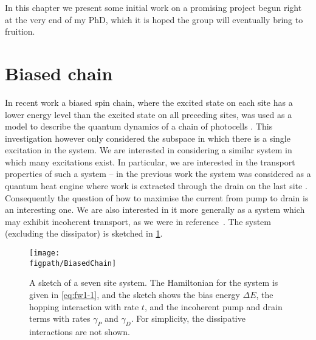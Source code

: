 In this chapter we present some initial work on a promising project begun right at the very end of my PhD, which it is hoped the group will eventually bring to fruition.

\section{Biased chain}
In recent work a biased spin chain, where the excited state on each site has a lower energy level than the excited state on all preceding sites, was used as a model to describe the quantum dynamics of a chain of photocells \cite{Fruchtman2016}. This investigation however only considered the subspace in which there is a single excitation in the system. We are interested in considering a similar system in which many excitations exist. In particular, we are interested in the transport properties of such a system -- in the previous work the system was considered as a quantum heat engine where work is extracted through the drain on the last site \cite{Dorfman2013}. Consequently the question of how to maximise the current from pump to drain is an interesting one. We are also interested in it more generally as a system which may exhibit incoherent transport, as we were in reference~\cite{Owen2017}. The system (excluding the dissipator) is sketched in \cref{fig:fw1-1}.

\begin{figure}[ht!]
	\centering
	\texttt{[image: \\figpath/BiasedChain]}
	\caption{\label{fig:fw1-1}A sketch of a seven site system. The Hamiltonian for the system is given in \cref{eq:fw1-1}, and the sketch shows the bias energy \(\Delta E\), the hopping interaction with rate \(t\), and the incoherent pump and drain terms with rates \(\gamma_{P}\) and \(\gamma_{D}\). For simplicity, the dissipative interactions are not shown.}
\end{figure}


